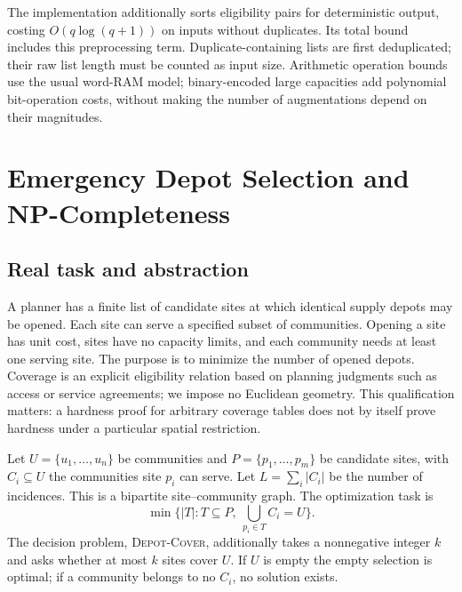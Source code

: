 \documentclass[sigconf,nonacm]{acmart}
\begin{document}
The implementation additionally sorts eligibility pairs for deterministic
output, costing $O(q\log(q+1))$ on inputs without duplicates. Its total bound
includes this preprocessing term. Duplicate-containing lists are first
deduplicated; their raw list length must be counted as input size. Arithmetic
operation bounds use the usual word-RAM model; binary-encoded large
capacities add polynomial bit-operation costs, without making the number of
augmentations depend on their magnitudes.

\section{Emergency Depot Selection and NP-Completeness}
\subsection{Real task and abstraction}
A planner has a finite list of candidate sites at which identical supply
depots may be opened. Each site can serve a specified subset of communities.
Opening a site has unit cost, sites have no capacity limits, and each
community needs at least one serving site. The purpose is to minimize the
number of opened depots. Coverage is an explicit eligibility relation based
on planning judgments such as access or service agreements; we impose no
Euclidean geometry. This qualification matters: a hardness proof for arbitrary
coverage tables does not by itself prove hardness under a particular spatial
restriction.

Let $U=\{u_1,\ldots,u_n\}$ be communities and
$P=\{p_1,\ldots,p_m\}$ be candidate sites, with $C_i\subseteq U$ the
communities site $p_i$ can serve. Let $L=\sum_i|C_i|$ be the number of
incidences. This is a bipartite site--community graph. The optimization task is
\[
\min\{|T|:T\subseteq P,\ \bigcup_{p_i\in T}C_i=U\}.
\]
The decision problem, \textsc{Depot-Cover}, additionally takes a nonnegative
integer $k$ and asks whether at most $k$ sites cover $U$. If $U$ is empty the
empty selection is optimal; if a community belongs to no $C_i$, no solution
exists.
\end{document}
